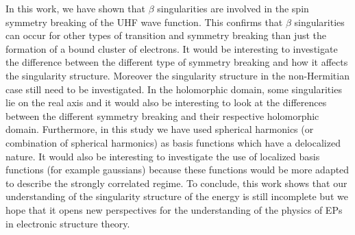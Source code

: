 \documentclass[11pt,a4paper]{article}
\begin{document}
In this work, we have shown that $\beta$ singularities are involved in the spin symmetry breaking of the UHF wave function. 
This confirms that $\beta$ singularities can occur for other types of transition and symmetry breaking than just the formation of a bound cluster of electrons. 
It would be interesting to investigate the difference between the different type of symmetry breaking and how it affects the singularity structure. 
Moreover the singularity structure in the non-Hermitian case still need to be investigated. 
In the holomorphic domain, some singularities lie on the real axis and it would also be interesting to look at the differences between the different symmetry breaking and their respective holomorphic domain. 
Furthermore, in this study we have used spherical harmonics (or combination of spherical harmonics) as basis functions which have a delocalized nature. It would also be interesting to investigate the use of localized basis functions \cite{Seidl_2018} (for example gaussians) because these functions would be more adapted to describe the strongly correlated regime. %
To conclude, this work shows that our understanding of the singularity structure of the energy is still incomplete but we hope that it opens new perspectives for the understanding of the physics of EPs in electronic structure theory.



\newpage
\printbibliography
\end{document}
